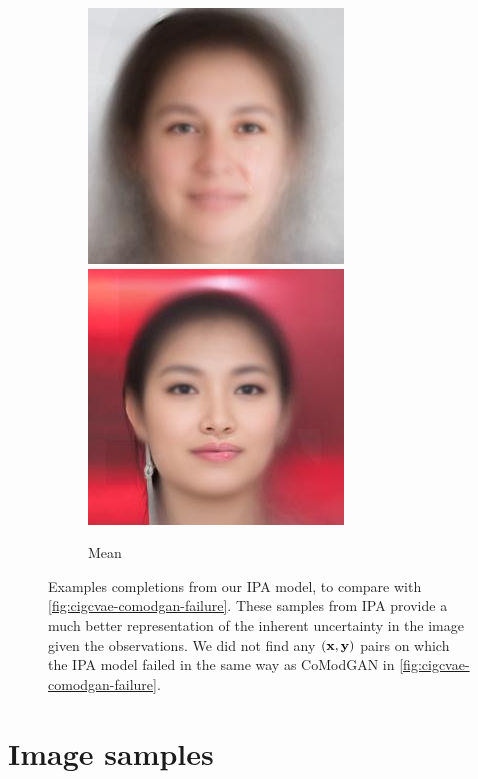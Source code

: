 \begin{figure}[t]
\begin{subfigure}[t]{0.1\textwidth}
    \includegraphics[height=\cmgfailureimgheight]{figs/cigcvae/co_mod_gan_failure/avg_aipo_1_4_2.jpg}
    \includegraphics[height=\cmgfailureimgheight]{figs/cigcvae/co_mod_gan_failure/avg_aipo_56_4_12.jpg}
    \caption{Mean}
  \end{subfigure}
  \caption{Examples completions from our IPA model, to compare with
    \cref{fig:cigcvae-comodgan-failure}. These samples from IPA provide a much better
    representation of the inherent uncertainty in the image given the
    observations. We did not find any $({\mathbf{x}}, {\mathbf{y}})$ pairs on which the IPA
    model failed in the same way as CoModGAN in \cref{fig:cigcvae-comodgan-failure}. }
  \label{fig:cigcvae-comodgan-failure-aipo}
\end{figure}

\section{Image samples}\label{supp:cigcvae-image-samples}


